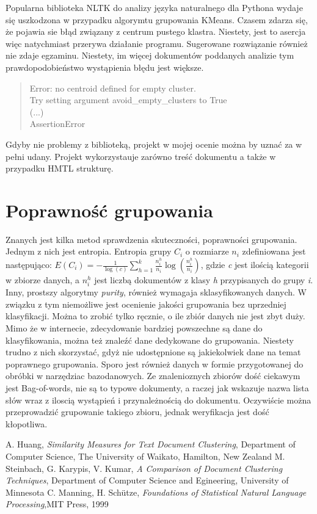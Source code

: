 \documentclass{article}
\begin{document}
Popularna biblioteka NLTK do analizy języka naturalnego dla Pythona wydaje się uszkodzona w przypadku algorymtu grupowania KMeans. Czasem zdarza się, że pojawia sie błąd związany z centrum pustego klastra. Niestety, jest to asercja więc natychmiast przerywa działanie programu. Sugerowane rozwiązanie również nie zdaje egzaminu. Niestety, im więcej dokumentów poddanych analizie tym prawdopodobieństwo wystąpienia błędu jest większe.
\begin{quotation}
Error: no centroid defined for empty cluster. \\
Try setting argument avoid\_empty\_clusters to True \\
(...) \\
AssertionError
\end{quotation}

Gdyby nie problemy z biblioteką, projekt w mojej ocenie można by uznać za w pełni udany. Projekt wykorzystauje zarówno treść dokumentu a także w przypadku HMTL strukturę. 

\section{Poprawność grupowania}
Znanych jest kilka metod sprawdzenia skuteczności, poprawności grupowania. Jednym z nich jest entropia. Entropia grupy \( C_{i} \) o rozmiarze \( n_{i} \) zdefiniowana jest następująco:
\( E(C_{i}) = -\frac{1}{\log(c)}\sum_{h=1}^{k}\frac{n_i^h}{n_i}\log(\frac{n_i^h}{n_i}) \), gdzie \emph{c} jest ilością kategorii w zbiorze danych, a \( n_i^h  \) jest liczbą dokumentów z klasy \emph{h} przypisanych do grupy \emph{i}. Inny, prostszy algorytmy \emph{purity}, również wymagaja sklasyfikowanych danych. W związku z tym niemożliwe jest ocenienie jakości grupowania bez uprzedniej klasyfikacji. Można to zrobić tylko ręcznie, o ile zbiór danych nie jest zbyt duży.
Mimo że w internecie, zdecydowanie bardziej powszechne są dane do klasyfikowania, można też znaleźć dane dedykowane do grupowania. Niestety trudno z nich skorzystać, gdyż nie udostępnione są jakiekolwiek dane na temat poprawnego grupowania. Sporo jest również danych w formie przygotowanej do obróbki w narzędziac bazodanowych. 
Ze znalenioznych zbiorów dość ciekawym jest Bag-of-words, nie są to typowe dokumenty, a raczej jak wskazuje nazwa lista słów wraz z iloscią wystąpień i przynależnością do dokumentu. Oczywiście można przeprowadzić grupowanie takiego zbioru, jednak weryfikacja jest dość kłopotliwa.

\begin{thebibliography}{9}
A. Huang, \emph{Similarity Measures for Text Document Clustering}, Department of Computer Science, The University of Waikato, Hamilton, New Zealand
M. Steinbach, G. Karypis, V. Kumar, \emph{A Comparison of Document Clustering Techniques}, Department of Computer Science and Egineering, University of Minnesota
C. Manning, H. Schütze, \emph{Foundations of Statistical Natural Language Processing},MIT Press, 1999
\end{thebibliography}
\end{document}
